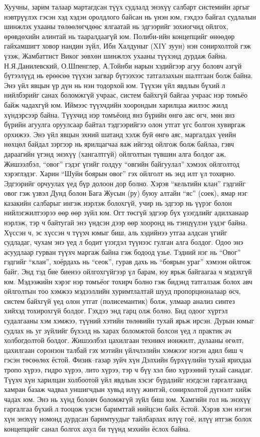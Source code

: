 Хуучны, зарим талаар мартагдсан түүх судлалд энэхүү салбарт системийн аргыг нэвтрүүлэх гэсэн хэд хэдэн оролдлого байсан нь үнэн юм, гэхдээ байгал судлалын шинжлэх ухааны төлөөлөгчдөөс ялгаатай нь эдгээрийг зохиогчид ойлгох, өрөвдөхийн алинтай нь тааралдаагүй юм. Полиби-ийн концепцийг өнөөдөр гайхамшигт ховор нандин зүйл, Ибн Халдуныг (XIY зуун) нэн сонирхолтой гэж үзэж, Жамбаттист Виког зөвхөн шинжлэх ухааны түүхэнд дурдаж байна. Н.Я.Данилевский, О.Шпенглер, А.Тойнби нарын хэдийгээр агуу боловч азгүй бүтээлүүд нь ерөөсөө түүхэн загвар бүтээхээс татгалзахын шалтгаан болж байна. Энэ үйл явцын үр дүн нь нэн тодорхой юм. Түүхэн үйл явдлын бүхий л нийлбэрийг санах боломжгүй учраас, систем байхгүй байгаа учраас нэр томъёо байж чадахгүй юм. Иймээс түүхчдийн хоорондын харилцаа жилээс жилд хүндэрсээр байна.
Түүхчид нэр томъёонд янз бүрийн өнгө аяс өгч, мөн янз бүрийн агуулга оруулсаар байтал тэдгээрийгээ олон утгат үгс болгон хувиргаж орхижээ. Энэ үйл явцын эхний шатанд хэлж буй өнгө аяс, маргалдах үеийн нөхцөл байдал зэргээр нь ярилцагчаа яаж ийгээд ойлгож болж байлаа, гэвч дараагийн үгэнд энэхүү (хангалтгүй) ойлголтын түвшин алга болдог аж. Жишээлбэл, “овог” гэдэг үгийг голдуу “овгийн байгуулал” хэмээх ойлголтод хэрэглэдэг. Харин “Шуйн боярын овог” гэх ойлголт нь энд илт үл тохирно. Эдгээрийг орчуулах үед бүр долоон дор болно. Хэрэв “кельтийн клан” гэдгийг овог гэж үзвэл Дунд болон Бага Жусын (ру) буюу алтайн “яс” (соек), ямар нэг казакийн салбарыг ингэж нэрлэж болохгүй, учир нь эдгээр нь үүрэг болон нийлэгжилтээрээ өөр өөр зүйл юм.
Огт төсгүй эдгээр бүх үзэгдлийг адилханаар нэрлэж, тэр ч байтугай энэ үндсэн дээр өөр хооронд нь тэнцүүлэн үздэг байна. Хүссэн ч, эс хүссэн ч түүхч юмыг биш, аль хэдийнээ утгаа алдсан үгийг судладаг, чухам энэ үед л бодит үзэгдэл түүнээс гулган алга болдог. Одоо энэ асуудлаар гурван түүхч маргаж байна гэж бодоод үзье. Тэдний нэг нь “Овог” гэдгийг “клан”, хоёрдахь нь “сеок”, гурав дахь нь “боярын ураг” хэмээн ойлгож байг. Энд тэд бие биенээ ойлгохгүйгээр үл барам, юу ярьж байгаагаа ч мэдэхгүй юм.
Мэдээжийн хэрэг нэр томъёог тохирч болно гэж бидэнд татгалзаж болох авч ойлголтын тоо хэмжээ мэдээллийн хуримтлалтай шууд пропорционалаар өсч, систем байхгүй үед олон утгат (полисемантик) болж, улмаар анализ синтез хийхэд тохирохгүй болдог. Гэхдээ энд гарц олж болно.
Бид одоог хүртэл судалгааны хэм хэмжээ, түүний хэтийн төлөвийн тухай ярьж ирсэн. Дурын юмыг судлах нь уг зүйлийг бүхэлд нь харах боломжтой болсон үед л практик ач холбогдолтой болдог. Жишээлбэл цахилгаан техникч ионжилт, дулааны өгөлт, цахилгаан соронзон талбай гэх мэтийн үйлчлэлийн хэмжээг нэгэн адил биш ч гэсэн төсөөлөх ёстой. Физик–газар зүйч хүн Дэлхийн бүрхүүлийн тухай ярихдаа тропо хүрээ, гидро хүрээ, лито хүрээ, тэр ч бүү хэл био хүрээний тухай санадаг. Түүхч хүн харилцан холбоотой үйл явдлын хэсэг бүрдлийг нэгдсэн гаргалгаанд хамран базаж чадвал уншигчдын хувьд илүү жинтэй, сонирхолтой дүгнэлт хийж чадах юм. Энэ нь хүнд боловч боломжгүй зүйл биш юм. Хамгийн гол нь энэхүү гаргалгаа бүхий л тооцож үзсэн баримттай нийцсэн байх ёстой. Хэрэв хэн нэгэн хүн энэхүү номонд дурдсан баримтуудыг тайлбарлах илүү гоё, илүү итгэж болох концепцийг санал болгох ахул би түүнд мэхийн ёслох байна.
